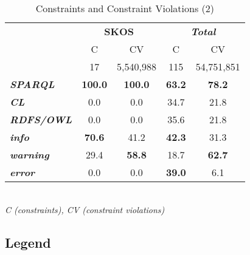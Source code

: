 \documentclass{llncs}
\newcommand{\tb}[1]{\todo[size=\small, color=green!40]{\textbf{Thomas:} #1}}
\begin{document}
\begin{table}[H]
		\scriptsize
    \begin{center}
		\caption{Constraints and Constraint Violations (2)}
		\label{tab:evaluation-constraint-violations-2}
    \begin{tabular}{@{}lcc|cc@{}}
    \multirow{2}{*}{} &
      \multicolumn{2}{c}{\textbf{SKOS}} &
      \multicolumn{2}{c}{\textbf{\emph{Total}}} \\
    \textbf{} & C & CV & C & CV \\
    \hline
		 & 17 & 5,540,988 & 115 & 54,751,851 \\
		\hline
		\textbf{\emph{SPARQL}} & \textbf{100.0} & \textbf{100.0} & \textbf{63.2} & \textbf{78.2} \\
		\textbf{\emph{CL}} & 0.0 & 0.0 & 34.7 & 21.8 \\
		\textbf{\emph{RDFS/OWL}} & 0.0 & 0.0 & 35.6 & 21.8 \\
		\hline
		\textbf{\emph{info}} & \textbf{70.6} & 41.2 & \textbf{42.3} & 31.3 \\
		\textbf{\emph{warning}} & 29.4 & \textbf{58.8} & 18.7 & \textbf{62.7} \\
		\textbf{\emph{error}} & 0.0 & 0.0 & \textbf{39.0} & 6.1\\
    \bottomrule
    \end{tabular}
    \\ \emph{C (constraints), CV (constraint violations)}
    \end{center}
\end{table}


\subsection{Legend}
\end{document}
